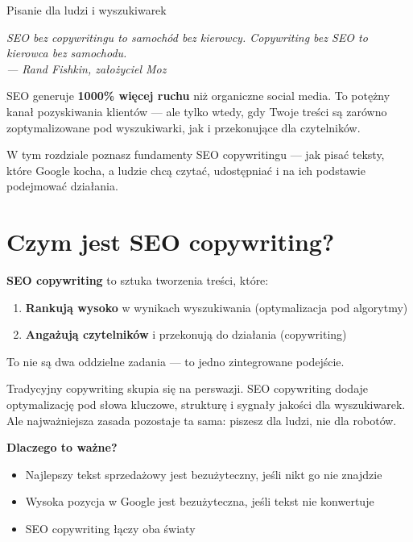 \documentclass[
  12pt,
  a4paper,
  twoside,
  openright,
  12pt,
  DIV=12,
  BCOR=12mm]{scrbook}
\providecommand{\tightlist}{%
  \setlength{\itemsep}{0pt}\setlength{\parskip}{0pt}}\usepackage{longtable,booktabs,array}
\newcommand{\chapteropener}[1]{%
  \begin{center}
    \large\itshape\color{textmuted}#1
  \end{center}
  \vspace{1em}
}
\begin{document}
Pisanie dla ludzi i wyszukiwarek

\hfill\break

\chapteropener{SEO bez copywritingu to samochód bez kierowcy. Copywriting bez SEO to kierowca bez samochodu.\\--- Rand Fishkin, założyciel Moz}

SEO generuje \textbf{1000\% więcej ruchu} niż organiczne social media.
To potężny kanał pozyskiwania klientów --- ale tylko wtedy, gdy Twoje
treści są zarówno zoptymalizowane pod wyszukiwarki, jak i przekonujące
dla czytelników.

W tym rozdziale poznasz fundamenty SEO copywritingu --- jak pisać
teksty, które Google kocha, a ludzie chcą czytać, udostępniać i na ich
podstawie podejmować działania.

\section{Czym jest SEO copywriting?}\label{czym-jest-seo-copywriting}

\textbf{SEO copywriting} to sztuka tworzenia treści, które:

\begin{enumerate}
\def\labelenumi{\arabic{enumi}.}
\tightlist
\item
  \textbf{Rankują wysoko} w wynikach wyszukiwania (optymalizacja pod
  algorytmy)
\item
  \textbf{Angażują czytelników} i przekonują do działania (copywriting)
\end{enumerate}

To nie są dwa oddzielne zadania --- to jedno zintegrowane podejście.

\begin{wazne}
Tradycyjny copywriting skupia się na perswazji. SEO copywriting dodaje optymalizację pod słowa kluczowe, strukturę i sygnały jakości dla wyszukiwarek. Ale najważniejsza zasada pozostaje ta sama: piszesz dla ludzi, nie dla robotów.
\end{wazne}

\textbf{Dlaczego to ważne?}

\begin{itemize}
\tightlist
\item
  Najlepszy tekst sprzedażowy jest bezużyteczny, jeśli nikt go nie
  znajdzie
\item
  Wysoka pozycja w Google jest bezużyteczna, jeśli tekst nie konwertuje
\item
  SEO copywriting łączy oba światy
\end{itemize}
\end{document}
